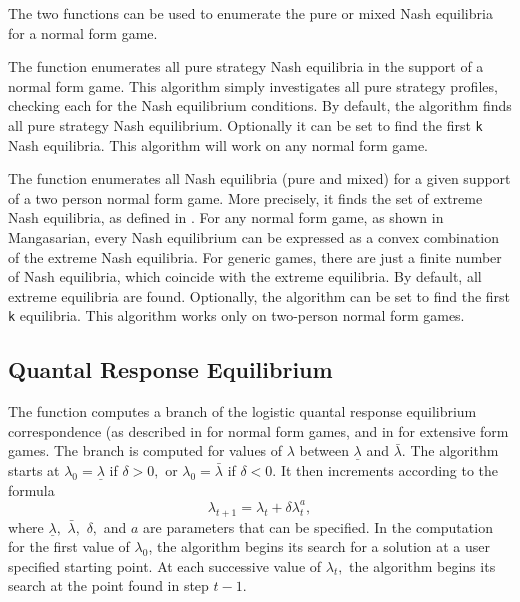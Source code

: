 The two  functions can be used to enumerate the pure or
mixed Nash equilibria for a normal form game.

The  function enumerates all pure strategy Nash
equilibria in the support of a normal form game.  This algorithm
simply investigates all pure strategy profiles, checking each for the
Nash equilibrium conditions.  By default, the algorithm finds all pure
strategy Nash equilibrium.  Optionally it can be set to find the first
\verb+k+ Nash equilibria.  This algorithm will work on any normal form
game.

The  function enumerates all Nash equilibria (pure
and mixed) for a given support of a two person normal form game.  More
precisely, it finds the set of extreme Nash equilibria, as defined in
\cite{Man:64}.  For any normal form game, as shown in
Mangasarian, every Nash equilibrium can be expressed as a convex
combination of the extreme Nash equilibria.  For generic games, there
are just a finite number of Nash equilibria, which coincide with the
extreme equilibria.  By default, all extreme equilibria are found.
Optionally, the algorithm can be set to find the first \verb+k+
equilibria.  This algorithm works only on two-person normal form
games.

\subsection{Quantal Response Equilibrium}

The  function computes a branch of the logistic
quantal response equilibrium correspondence (as described in
\cite{McKPal:95a} for normal form games, and in
\cite{McKPal:95b} for extensive form games.  The branch is
computed for values of $\lambda$ between $\underline{\lambda}$ and
$\bar{\lambda}.$ The algorithm starts at $\lambda_0 =
\underline{\lambda}$ if $\delta>0,$ or $\lambda_0 = \bar{\lambda}$ if
$\delta<0$. It then increments according to the formula
$$
\lambda_{t+1} = \lambda_t +\delta \lambda_t^a,
$$ 
where $\underline\lambda,$ $\bar\lambda,$ $\delta,$ and $a$ are
parameters that can be specified.  In the computation for the first value of
$\lambda_0$, the algorithm begins its search for a solution at a user
specified starting point.  At each
successive value of $\lambda_t,$ the algorithm begins its search at
the point found in step $t - 1.$ 

